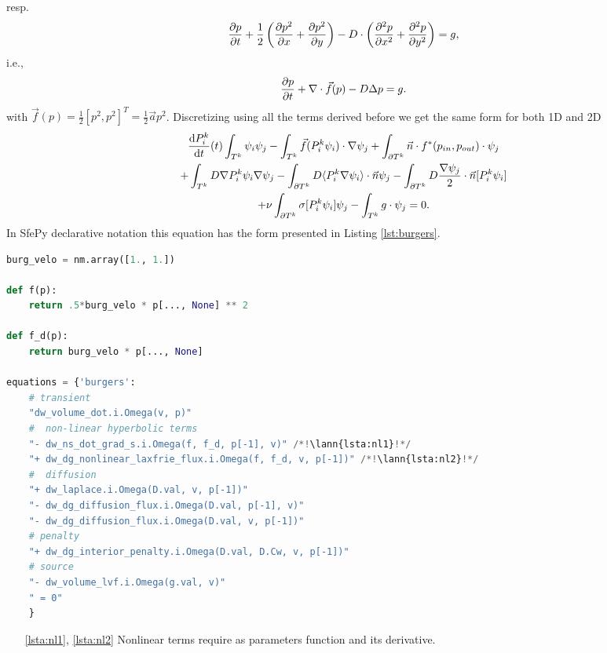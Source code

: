 resp.
\begin{equation}
\label{eq:ex_burgers}
	\frac{\partial p}{\partial t} + \frac{1}{2}\left(\frac{\partial p^2}{\partial x} + \frac{\partial p^2}{\partial y}\right)  - 
	D \cdot \left( \frac{\partial^2 p}{\partial x^2} + \frac{\partial^2 p}{\partial y^2} \right) 
	= g,
\end{equation}
i.e.,
\begin{equation}
	\frac{\partial p}{\partial t} + \nabla \cdot \vec{f}(p) - D\Delta p = g.
\end{equation}
with $\vec{f}(p) = \frac{1}{2}[p^2, p^2]^T = \frac{1}{2}\vec{a} p^2$.
Discretizing using all the terms derived before we get the same form for both 1D and 2D
\begin{multline}
	\frac{\text{d}P^k_i}{\text{d}t}(t)\int_{T^k}\psi_i\psi_j 
	- \int_{T^k} \vec{f}(P_i^k\psi_i)\cdot\nabla\psi_j 
	+ \int_{\partial{T^k}} \vec{n} \cdot f^{*} (p_{in}, p_{out})\cdot\psi_j\\
	+ \int_{T^k} D\nabla P^k_i\psi_i \nabla \psi_j
	- \int_{\partial T^k} D \langle P^k_i\nabla\psi_i\rangle \cdot \vec{n}\psi_j
	- \int_{\partial T^k} D \frac{\nabla \psi_j}{2}\cdot \vec{n} [P^k_i\psi_i] \\
	+ \nu \int_{\partial T^k} \sigma [P^k_i\psi_i]\psi_j
	- \int_{T^k} g\cdot \psi_j
	= 0.
\end{multline}
In SfePy declarative notation this equation has the form presented in 
Listing \ref{lst:burgers}.
\setcounter{lstannotation}{0}
\begin{lstlisting}[language=Python, caption=Viscous Burgers equation \label{lst:burgers}]
burg_velo = nm.array([1., 1.])

def f(p):
	return .5*burg_velo * p[..., None] ** 2

def f_d(p):
	return burg_velo * p[..., None]

equations = {'burgers':
	# transient
	"dw_volume_dot.i.Omega(v, p)"
	#  non-linear hyperbolic terms
	"- dw_ns_dot_grad_s.i.Omega(f, f_d, p[-1], v)" /*!\lann{lsta:nl1}!*/
	"+ dw_dg_nonlinear_laxfrie_flux.i.Omega(f, f_d, v, p[-1])" /*!\lann{lsta:nl2}!*/
	#  diffusion
	"+ dw_laplace.i.Omega(D.val, v, p[-1])"
	"- dw_dg_diffusion_flux.i.Omega(D.val, p[-1], v)"
	"- dw_dg_diffusion_flux.i.Omega(D.val, v, p[-1])"
	# penalty
	"+ dw_dg_interior_penalty.i.Omega(D.val, D.Cw, v, p[-1])"
	# source
	"- dw_volume_lvf.i.Omega(g.val, v)"
	" = 0"
	}
\end{lstlisting}
\begin{itemize}
	\item[\ref{lsta:nl1}, \ref{lsta:nl2}] Nonlinear terms require as parameters function 
	and its derivative.
\end{itemize}


